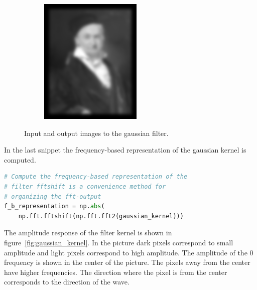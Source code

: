 \documentclass[]{article}
\begin{document}
\begin{figure}
\begin{subfigure}[t]{0.49\textwidth}
      \includegraphics[width=0.99\linewidth]{output.png}
    \end{subfigure}
    \caption{Input and output images to the gaussian filter.}
\end{figure}

In the last snippet the frequency-based representation of the gaussian kernel
is computed.
\begin{lstlisting}[language=Python]
# Compute the frequency-based representation of the
# filter fftshift is a convenience method for
# organizing the fft-output
f_b_representation = np.abs(
    np.fft.fftshift(np.fft.fft2(gaussian_kernel)))
\end{lstlisting}
The amplitude response of the filter kernel is shown in
figure~\ref{fig:gaussian_kernel}. In the picture dark pixels correspond to small
amplitude and light pixels correspond to high amplitude. The amplitude of the 0
frequency is shown in the center of the picture. The pixels away from the center
have higher frequencies. The direction where the pixel is from the center
corresponds to the direction of the wave.
\end{document}
